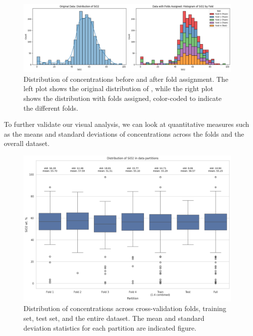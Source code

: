 \begin{figure}[h!]
    \centering
    \includegraphics[width=\textwidth]{images/original_and_post_fold.png}
    \caption{Distribution of  concentrations before and after fold assignment. The left plot shows the original distribution of , while the right plot shows the distribution with folds assigned, color-coded to indicate the different folds.}
    \label{fig:original_and_post_fold_plot}
\end{figure}


To further validate our visual analysis, we can look at quantitative measures such as the means and standard deviations of  concentrations across the folds and the overall dataset.

\begin{figure}[htbp]
    \centering
    \includegraphics[width=\textwidth]{images/distribution_plot.png}
    \caption{Distribution of  concentrations across cross-validation folds, training set, test set, and the entire dataset. The mean and standard deviation statistics for each partition are indicated figure.}
    \label{fig:siO2_distribution}
\end{figure}

